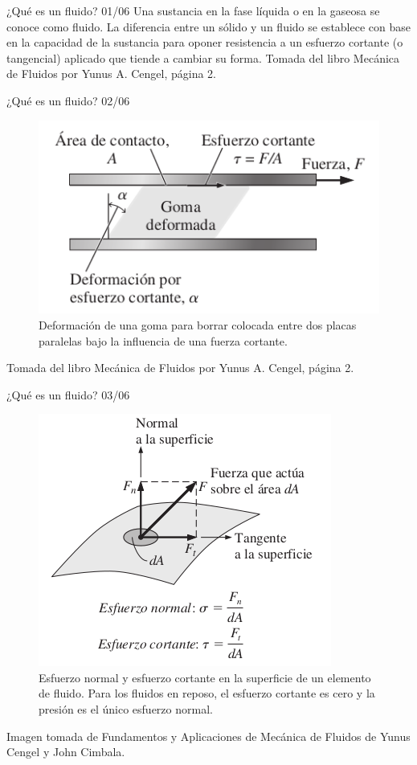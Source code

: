 \begin{frame}{¿Qué es un fluido? 01/06}
\justifying
Una sustancia en la fase líquida o en la gaseosa se conoce como fluido. La diferencia entre un sólido y un fluido se establece con base en la capacidad de la sustancia para oponer resistencia a un esfuerzo cortante (o tangencial) aplicado que tiende a cambiar su forma.
{\tiny Tomada del libro Mecánica de Fluidos por Yunus A. Cengel, página 2.}
\end{frame}
	
\begin{frame}{¿Qué es un fluido? 02/06}
\justifying
\begin{figure}[H]
\centering
\includegraphics[scale=0.3]{Section_Files/imagenes/sec01_0101_Fig01-02.png}
\caption{Deformación de una goma para borrar colocada entre dos placas paralelas bajo la influencia de una fuerza cortante.}
\label{fig: Figura1-02}
\end{figure}
{\tiny Tomada del libro Mecánica de Fluidos por Yunus A. Cengel, página 2.}
\end{frame}
	
\begin{frame}{¿Qué es un fluido? 03/06}
\justifying
\begin{figure}[H]
\centering
\includegraphics[scale=0.3]{Section_Files/imagenes/sec01_0101_Fig01-03.png}
\caption{Esfuerzo normal y esfuerzo cortante en la superficie de un elemento de fluido. Para los fluidos en reposo, el esfuerzo cortante es cero y la presión es el único esfuerzo normal.}
\label{fig: Figura1-03}
\end{figure}
Imagen tomada de Fundamentos y Aplicaciones de Mecánica de Fluidos de Yunus Cengel y John Cimbala.
\end{frame}	
	
